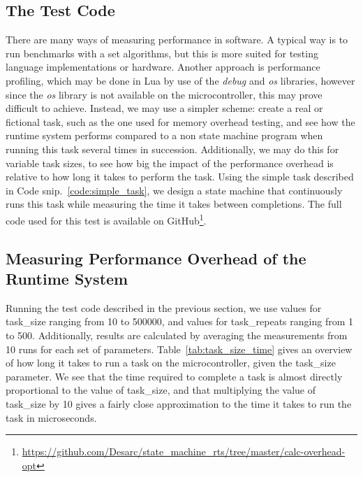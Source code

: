 \subsection{The Test Code}
\label{sec:performance_test_code}
There are many ways of measuring performance in software. A typical way is to run benchmarks with a set algorithms, but this is more suited for testing language implementations or hardware. Another approach is performance profiling, which may be done in Lua by use of the \emph{debug} and \emph{os} libraries, however since the \emph{os} library is not available on the microcontroller, this may prove difficult to achieve. Instead, we may use a simpler scheme: create a real or fictional task, such as the one used for memory overhead testing, and see how the runtime system performs compared to a non state machine program when running this task several times in succession. Additionally, we may do this for variable task sizes, to see how big the impact of the performance overhead is relative to how long it takes to perform the task. Using the simple task described in Code snip.~\ref{code:simple_task}, we design a state machine that continuously runs this task while measuring the time it takes between completions. The full code used for this test is available on GitHub\footnote{\url{https://github.com/Desarc/state_machine_rts/tree/master/calc-overhead-opt}}.

\subsection{Measuring Performance Overhead of the Runtime System}
\label{sec:performance_overhead_measure}
Running the test code described in the previous section, we use values for task\_size ranging from 10 to 500000, and values for task\_repeats ranging from 1 to 500. Additionally, results are calculated by averaging the measurements from 10 runs for each set of parameters. Table~\ref{tab:task_size_time} gives an overview of how long it takes to run a task on the microcontroller, given the task\_size parameter. We see that the time required to complete a task is almost directly proportional to the value of task\_size, and that multiplying the value of task\_size by 10 gives a fairly close approximation to the time it takes to run the task in microseconds.

